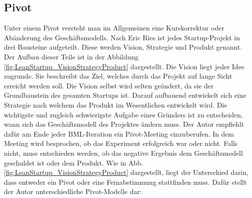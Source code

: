 \subsection*{\label{sec:LeanStartup-Pivot}\thesubsection\quad Pivot}
Unter einem Pivot versteht man im Allgemeinen eine Kurskorrektur oder Abänderung des Geschäftsmodells. Nach Eric Ries ist jedes Startup-Projekt in drei Bausteine aufgeteilt. Diese werden Vision, Strategie und Produkt genannt. Der Aufbau dieser Teile ist in der Abbildung \ref{fig:LeanStartup_VisionStrategyProduct} dargestellt. 
Die Vision liegt jeder Idee zugrunde. Sie beschreibt das Ziel, welches durch das Projekt auf lange Sicht erreicht werden soll. Die Vision selbst wird selten geändert, da sie der Grundbaustein des gesamten Startups ist. Darauf aufbauend entwickelt sich eine Strategie nach welchem das Produkt im Wesentlichen entwickelt wird. Die wichtigste und zugleich schwierigste Aufgabe eines Gründers ist zu entscheiden, wann sich das Geschäftsmodell des Projektes ändern muss. Der Autor empfiehlt dafür am Ende jeder \ac{BML}-Iteration ein Pivot-Meeting einzuberufen. In dem Meeting wird besprochen, ob das Experiment erfolgreich war oder nicht. Falls nicht, muss entschieden werden, ob das negative Ergebnis dem Geschäftsmodell geschuldet ist oder dem Produkt. Wie in Abb. \ref{fig:LeanStartup_VisionStrategyProduct} dargestellt, liegt der Unterschied darin, dass entweder ein Pivot oder eine Feinabstimmung stattfinden muss. Dafür stellt der Autor unterschiedliche Pivot-Modelle dar:
